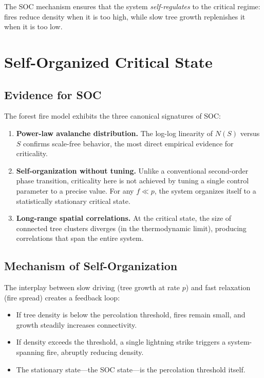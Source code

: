 \documentclass[12pt, a4paper]{article}
\begin{document}
The SOC mechanism ensures that the system \emph{self-regulates} to the critical
regime: fires reduce density when it is too high, while slow tree growth replenishes
it when it is too low.

\section{Self-Organized Critical State}
\label{sec:soc}

\subsection{Evidence for SOC}

The forest fire model exhibits the three canonical signatures of SOC:

\begin{enumerate}
    \item \textbf{Power-law avalanche distribution.} The log-log linearity of
    $N(S)$ versus $S$ confirms scale-free behavior, the most direct empirical
    evidence for criticality.

    \item \textbf{Self-organization without tuning.} Unlike a conventional
    second-order phase transition, criticality here is not achieved by tuning
    a single control parameter to a precise value. For any $f \ll p$, the system
    organizes itself to a statistically stationary critical state.

    \item \textbf{Long-range spatial correlations.} At the critical state, the
    size of connected tree clusters diverges (in the thermodynamic limit),
    producing correlations that span the entire system.
\end{enumerate}

\subsection{Mechanism of Self-Organization}

The interplay between slow driving (tree growth at rate $p$) and fast relaxation
(fire spread) creates a feedback loop:
\begin{itemize}
    \item If tree density is below the percolation threshold, fires remain small,
    and growth steadily increases connectivity.
    \item If density exceeds the threshold, a single lightning strike triggers
    a system-spanning fire, abruptly reducing density.
    \item The stationary state—the SOC state—is the percolation threshold itself.
\end{itemize}
\end{document}

